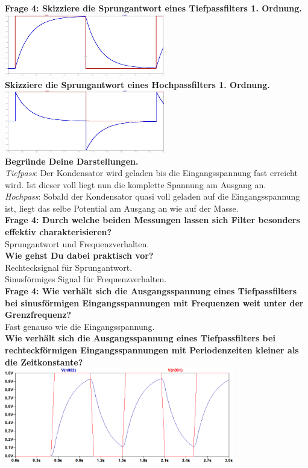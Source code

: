 \documentclass[11pt,a4paper]{scrartcl}
\begin{document}
\textbf{Frage 4: Skizziere die Sprungantwort eines Tiefpassfilters 1. Ordnung.}\\
\includegraphics[width=7cm]{sprung_tiefpass.jpg}\\
\textbf{Skizziere die Sprungantwort eines Hochpassfilters 1. Ordnung.}\\
\includegraphics[width=7cm]{sprung_hochpass.jpg}\\
\textbf{Begründe Deine Darstellungen.}\\
\textit{Tiefpass}: Der Kondensator wird geladen bis die Eingangsspannung fast erreicht wird. Ist dieser voll liegt nun die komplette Spannung am Ausgang an.\\
\textit{Hochpass}: Sobald der Kondensator quasi voll geladen auf die Eingangsspannung ist, liegt das selbe Potential am Ausgang an wie auf der Masse.\\
\textbf{Frage 4: Durch welche beiden Messungen lassen sich Filter besonders effektiv charakterisieren?}\\
Sprungantwort und Frequenzverhalten.\\
\textbf{Wie gehst Du dabei praktisch vor?}\\
Rechtecksignal für Sprungantwort.\\
Sinusförmiges Signal für Frequenzverhalten.\\
\textbf{Frage 4: Wie verhält sich die Ausgangsspannung eines Tiefpassfilters bei sinusförmigen Eingangsspannungen mit Frequenzen weit unter der Grenzfrequenz?}\\
Fast genauso wie die Eingangsspannung.\\
\newpage
\textbf{Wie verhält sich die \textcolor[rgb]{0,0,1}{Ausgangsspannung} eines Tiefpassfilters bei \textcolor[rgb]{1,0,0}{rechteckförmigen Eingangsspannungen} mit Periodenzeiten kleiner als die Zeitkonstante?}\\
\includegraphics[width=10cm]{TP_Rechteck.png}\\
\end{document}
